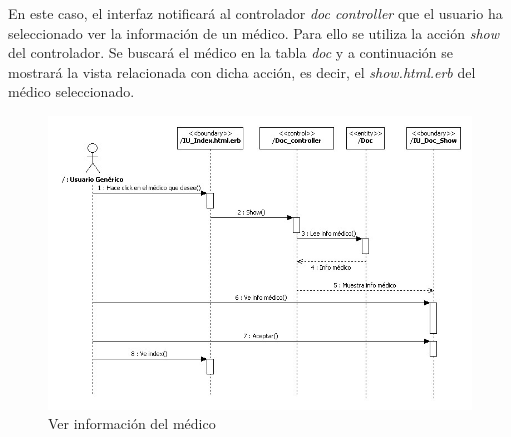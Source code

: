 				En este caso, el interfaz notificará al controlador \textit{doc controller} que el usuario ha seleccionado ver la información de un médico. Para ello se utiliza la acción \textit{show} del controlador. Se buscará el médico en la tabla \textit{doc} y a continuación se mostrará la vista relacionada con dicha acción, es decir, el \textit{show.html.erb} del médico seleccionado.
				\begin{figure}[H]
				  \centering
				    \includegraphics[width=16cm]{img/jpg/secuencia/02_VerInfoMedico.jpg}
				  \caption{Ver información del médico}
				  \label{fig:sec_general_verinfomedico}
				\end{figure}
			

	

